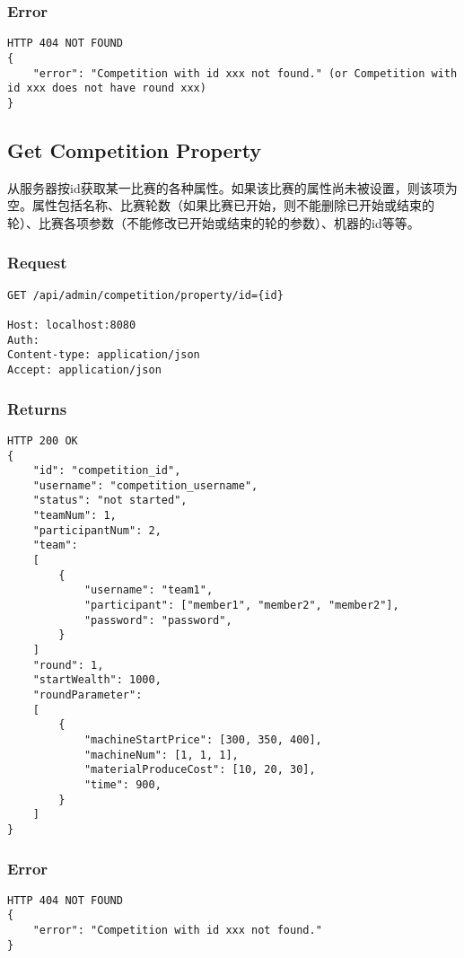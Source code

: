 \documentclass{article}
\begin{document}
\subsubsection*{Error}
\begin{lstlisting}
HTTP 404 NOT FOUND
{
    "error": "Competition with id xxx not found." (or Competition with id xxx does not have round xxx)
}
\end{lstlisting}


\subsection{Get Competition Property}

从服务器按id获取某一比赛的各种属性。如果该比赛的属性尚未被设置，则该项为空。属性包括名称、比赛轮数（如果比赛已开始，则不能删除已开始或结束的轮）、比赛各项参数（不能修改已开始或结束的轮的参数）、机器的id等等。

\subsubsection*{Request}
\begin{lstlisting}
GET /api/admin/competition/property/id={id}

Host: localhost:8080
Auth:
Content-type: application/json
Accept: application/json
\end{lstlisting}

\subsubsection*{Returns}
\begin{lstlisting}
HTTP 200 OK
{
    "id": "competition_id",
    "username": "competition_username",
    "status": "not started",
    "teamNum": 1,
    "participantNum": 2,
    "team":
    [
        {
            "username": "team1",
            "participant": ["member1", "member2", "member2"],
            "password": "password",
        }
    ]
    "round": 1,
    "startWealth": 1000,
    "roundParameter":
    [
        {
            "machineStartPrice": [300, 350, 400],
            "machineNum": [1, 1, 1],
            "materialProduceCost": [10, 20, 30],
            "time": 900,
        }
    ]
}

\end{lstlisting}

\subsubsection*{Error}
\begin{lstlisting}
HTTP 404 NOT FOUND
{
    "error": "Competition with id xxx not found."
}
\end{lstlisting}
\end{document}

